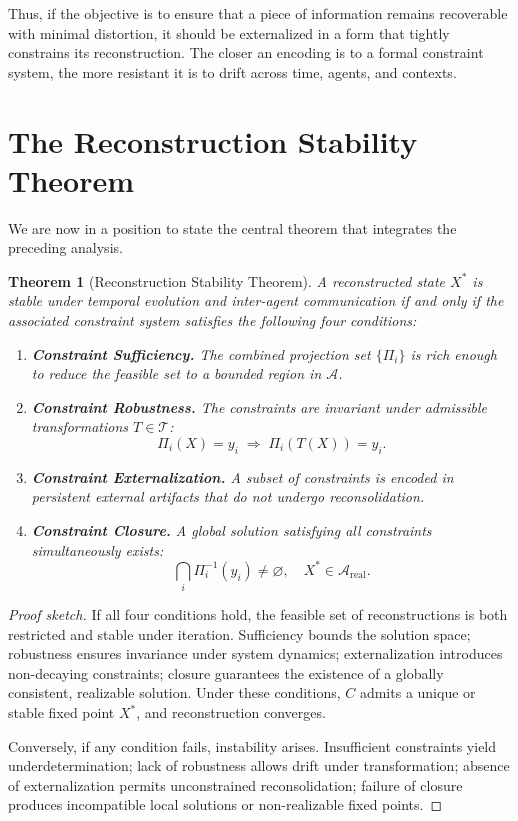 \documentclass[12pt, letterpaper]{article}
\theoremstyle{flyxion}
\newtheorem{theorem}{Theorem}
\begin{document}
Thus, if the objective is to ensure that a piece of information remains recoverable with minimal distortion, it should be externalized in a form that tightly constrains its reconstruction. The closer an encoding is to a formal constraint system, the more resistant it is to drift across time, agents, and contexts.

\section{The Reconstruction Stability Theorem}

We are now in a position to state the central theorem that integrates the preceding analysis.

\begin{theorem}[Reconstruction Stability Theorem]
A reconstructed state $X^*$ is stable under temporal evolution and inter-agent communication if and only if the associated constraint system satisfies the following four conditions:
\begin{enumerate}
\item \textbf{Constraint Sufficiency.} The combined projection set $\{\Pi_i\}$ is rich enough to reduce the feasible set to a bounded region in $\mathcal{A}$.
\item \textbf{Constraint Robustness.} The constraints are invariant under admissible transformations $T \in \mathcal{T}$:
\[
\Pi_i(X) = y_i \;\Rightarrow\; \Pi_i(T(X)) = y_i.
\]
\item \textbf{Constraint Externalization.} A subset of constraints is encoded in persistent external artifacts that do not undergo reconsolidation.
\item \textbf{Constraint Closure.} A global solution satisfying all constraints simultaneously exists:
\[
\bigcap_i \Pi_i^{-1}(y_i) \neq \varnothing,\quad X^* \in \mathcal{A}_\mathrm{real}.
\]
\end{enumerate}
\end{theorem}

\begin{proof}[Proof sketch]
If all four conditions hold, the feasible set of reconstructions is both restricted and stable under iteration. Sufficiency bounds the solution space; robustness ensures invariance under system dynamics; externalization introduces non-decaying constraints; closure guarantees the existence of a globally consistent, realizable solution. Under these conditions, $C$ admits a unique or stable fixed point $X^*$, and reconstruction converges.

Conversely, if any condition fails, instability arises. Insufficient constraints yield underdetermination; lack of robustness allows drift under transformation; absence of externalization permits unconstrained reconsolidation; failure of closure produces incompatible local solutions or non-realizable fixed points.
\end{proof}
\end{document}
